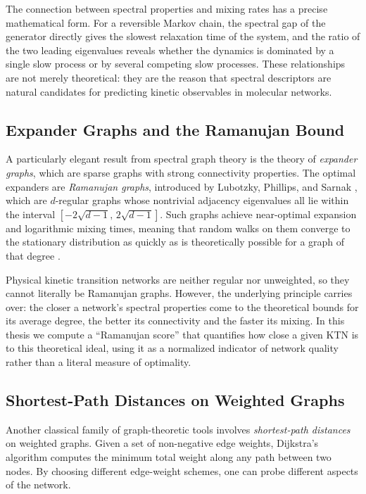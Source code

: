 The connection between spectral properties and mixing rates has a precise
mathematical form. For a reversible Markov chain, the spectral gap of the
generator directly gives the slowest relaxation time of the system, and the
ratio of the two leading eigenvalues reveals whether the dynamics is dominated
by a single slow process or by several competing slow processes. These
relationships are not merely theoretical: they are the reason that spectral
descriptors are natural candidates for predicting kinetic observables in
molecular networks.

\subsection{Expander Graphs and the Ramanujan Bound}

A particularly elegant result from spectral graph theory is the theory of
\emph{expander graphs}, which are sparse graphs with strong connectivity
properties. The optimal expanders are \emph{Ramanujan graphs}, introduced by
Lubotzky, Phillips, and Sarnak \cite{Lubotzky1988Ramanujan}, which are
$d$-regular graphs whose nontrivial adjacency eigenvalues all lie within the
interval $[-2\sqrt{d-1},\, 2\sqrt{d-1}]$. Such graphs achieve near-optimal
expansion and logarithmic mixing times, meaning that random walks on them
converge to the stationary distribution as quickly as is theoretically
possible for a graph of that degree \cite{Murty2003RamanujanSurvey}.

Physical kinetic transition networks are neither regular nor unweighted, so
they cannot literally be Ramanujan graphs. However, the underlying principle
carries over: the closer a network's spectral properties come to the
theoretical bounds for its average degree, the better its connectivity and the
faster its mixing. In this thesis we compute a ``Ramanujan score'' that
quantifies how close a given KTN is to this theoretical ideal, using it as a
normalized indicator of network quality rather than a literal measure of
optimality.

\subsection{Shortest-Path Distances on Weighted Graphs}

Another classical family of graph-theoretic tools involves
\emph{shortest-path distances} on weighted graphs. Given a set of non-negative
edge weights, Dijkstra's algorithm computes the minimum total weight along any
path between two nodes. By choosing different edge-weight schemes, one can
probe different aspects of the network.

